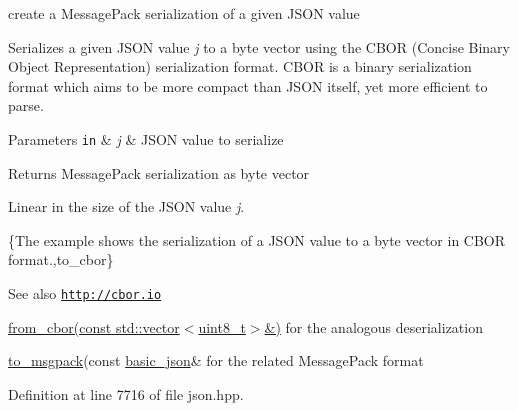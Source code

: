 create a Message\+Pack serialization of a given J\+S\+O\+N value 

Serializes a given J\+S\+O\+N value {\itshape j} to a byte vector using the C\+B\+O\+R (Concise Binary Object Representation) serialization format. C\+B\+O\+R is a binary serialization format which aims to be more compact than J\+S\+O\+N itself, yet more efficient to parse.


\begin{DoxyParams}[1]{Parameters}
\mbox{\tt in}  & {\em j} & J\+S\+O\+N value to serialize \\
\hline
\end{DoxyParams}
\begin{DoxyReturn}{Returns}
Message\+Pack serialization as byte vector
\end{DoxyReturn}
Linear in the size of the J\+S\+O\+N value {\itshape j}.

\{The example shows the serialization of a J\+S\+O\+N value to a byte vector in C\+B\+O\+R format.,to\+\_\+cbor\}

\begin{DoxySeeAlso}{See also}
\href{http://cbor.io}{\tt http\+://cbor.\+io} 

\hyperlink{classnlohmann_1_1basic__json_a832e482e6248823977628fefa3d780d1}{from\+\_\+cbor(const std\+::vector$<$uint8\+\_\+t$>$\&)} for the analogous deserialization 

\hyperlink{classnlohmann_1_1basic__json_a3ac608b8f63761a73b4fc0d2312d77b5}{to\+\_\+msgpack}(const \hyperlink{classnlohmann_1_1basic__json}{basic\+\_\+json}\& for the related Message\+Pack format 
\end{DoxySeeAlso}


Definition at line 7716 of file json.\+hpp.

\hypertarget{classnlohmann_1_1basic__json_a832e482e6248823977628fefa3d780d1}{}
